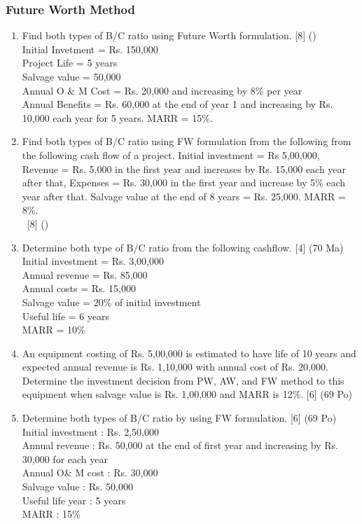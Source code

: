 \documentclass[12pt]{article}
\newcommand{\enter}{\\\textcolor{white}{1}}
\begin{document}
	\subsubsection{Future Worth Method}
	\begin{enumerate}[noitemsep, topsep = 0pt]
		\item Find both types of B/C ratio using Future Worth formulation. \hfill [8] ()\\
		Initial Invetment = Rs. 150,000\\
		Project Life = 5 years\\
		Salvage value = 50,000\\
		Annual O \& M Cost = Rs. 20,000 and increasing by 8\% per year\\
		Annual Benefits = Rs. 60,000 at the end of year 1 and increasing by Rs. 10,000 each year for 5 years. MARR = 15\%.
		
		
		
		\item Find both types of B/C ratio using FW formulation from the following from the following cash flow of a project. Initial investment = Rs 5,00,000, Revenue = Rs. 5,000 in the first year and increases by Rs. 15,000 each year after that, Expenses = Rs. 30,000 in the first year and increase by 5\% each year after that. Salvage value at the end of 8 years = Rs. 25,000. MARR = 8\%. 
		\enter\hfill [8] ()
		
		\item Determine both type of B/C ratio from the following cashflow. \hfill [4] (70 Ma)\\
		Initial investment = Rs. 3,00,000\\
		Annual revenue = Rs. 85,000\\
		Annual costs = Rs. 15,000\\
		Salvage value = 20\% of initial investment\\
		Useful life = 6 years\\
		MARR = 10\%
		
		\item An equipment costing of Rs. 5,00,000 is estimated to have life of 10 years and expected annual revenue is Rs. 1,10,000 with annual cost of Rs. 20,000. Determine the investment decision from PW, AW, and FW method to this equipment when salvage value is Rs. 1,00,000 and MARR is 12\%. \hfill [6] (69 Po)
		
		\item Determine both types of B/C ratio by using FW formulation. \hfill [6] (69 Po)\\
		Initial investment : Rs. 2,50,000\\
		Annual revenue     : Rs. 50,000 at the end of first year and increasing by Rs. 30,000 for each year\\
		Annual O\& M cost  : Rs. 30,000\\
		Salvage value      : Rs. 50,000\\
		Useful life year   : 5 years\\
		MARR               : 15\%	
	\end{enumerate}
\end{document}
